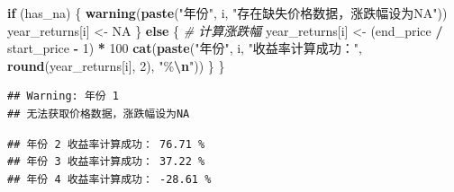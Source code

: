 \documentclass[]{ctexbook}
\newenvironment{Shaded}{\begin{snugshade}}{\end{snugshade}}
\newcommand{\CommentTok}[1]{\textcolor[rgb]{0.56,0.35,0.01}{\textit{#1}}}
\newcommand{\ConstantTok}[1]{\textcolor[rgb]{0.56,0.35,0.01}{#1}}
\newcommand{\ControlFlowTok}[1]{\textcolor[rgb]{0.13,0.29,0.53}{\textbf{#1}}}
\newcommand{\DecValTok}[1]{\textcolor[rgb]{0.00,0.00,0.81}{#1}}
\newcommand{\FunctionTok}[1]{\textcolor[rgb]{0.13,0.29,0.53}{\textbf{#1}}}
\newcommand{\NormalTok}[1]{#1}
\newcommand{\OtherTok}[1]{\textcolor[rgb]{0.56,0.35,0.01}{#1}}
\newcommand{\SpecialCharTok}[1]{\textcolor[rgb]{0.81,0.36,0.00}{\textbf{#1}}}
\newcommand{\StringTok}[1]{\textcolor[rgb]{0.31,0.60,0.02}{#1}}
\begin{document}
\begin{Shaded}
\begin{Highlighting}[]
  \ControlFlowTok{if}\NormalTok{ (has\_na) \{}
    \FunctionTok{warning}\NormalTok{(}\FunctionTok{paste}\NormalTok{(}\StringTok{"年份"}\NormalTok{, i, }\StringTok{"存在缺失价格数据，涨跌幅设为NA"}\NormalTok{))}
\NormalTok{    year\_returns[i] }\OtherTok{\textless{}{-}} \ConstantTok{NA}
\NormalTok{  \} }\ControlFlowTok{else}\NormalTok{ \{}
    \CommentTok{\# 计算涨跌幅}
\NormalTok{    year\_returns[i] }\OtherTok{\textless{}{-}}\NormalTok{ (end\_price }\SpecialCharTok{/}\NormalTok{ start\_price }\SpecialCharTok{{-}} \DecValTok{1}\NormalTok{) }\SpecialCharTok{*} \DecValTok{100}
    \FunctionTok{cat}\NormalTok{(}\FunctionTok{paste}\NormalTok{(}\StringTok{"年份"}\NormalTok{, i, }\StringTok{"收益率计算成功："}\NormalTok{, }\FunctionTok{round}\NormalTok{(year\_returns[i], }\DecValTok{2}\NormalTok{), }\StringTok{"\%}\SpecialCharTok{\textbackslash{}n}\StringTok{"}\NormalTok{))}
\NormalTok{  \}}
\NormalTok{\}}
\end{Highlighting}
\end{Shaded}

\begin{verbatim}
## Warning: 年份 1
## 无法获取价格数据，涨跌幅设为NA
\end{verbatim}

\begin{verbatim}
## 年份 2 收益率计算成功： 76.71 %
## 年份 3 收益率计算成功： 37.22 %
## 年份 4 收益率计算成功： -28.61 %
\end{verbatim}
\end{document}
